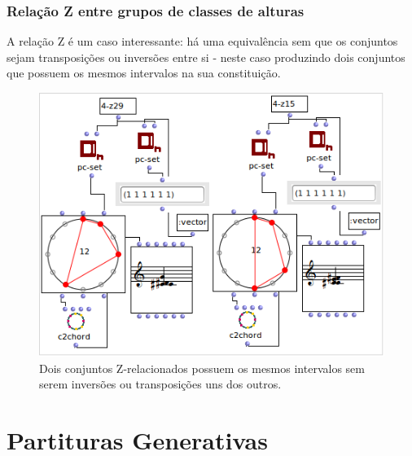 \documentclass[
	12pt,				%
	openright,			%
	twoside,			%
	a4paper,			%
	english,			%
	french,				%
	spanish,			%
	brazil				%
	]{abntex2}
\begin{document}
\begin{apendicesenv}
\subsection{Relação Z entre grupos de classes de alturas}

A relação Z é um caso interessante: há uma equivalência sem que os conjuntos sejam transposições ou inversões entre si - neste caso produzindo dois conjuntos que possuem os mesmos intervalos na sua constituição.


\begin{figure}[!h]
	\caption{\label{fig_grafico}Dois conjuntos Z-relacionados possuem os mesmos intervalos sem serem inversões ou transposições uns dos outros. }
	\begin{center}
	    \includegraphics[scale=0.6]{OM_settheory/Z_related.png}
	\end{center}
\end{figure}

\end{apendicesenv}

\chapter{Partituras Generativas}
%
\end{document}
